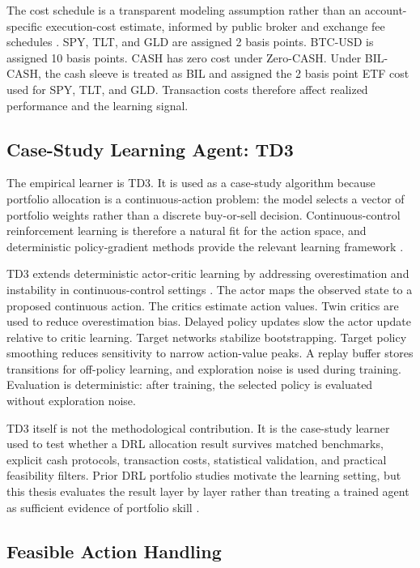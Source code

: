 \documentclass[12pt]{article}
\begin{document}
The cost schedule is a transparent modeling assumption rather than an account-specific execution-cost estimate, informed by public broker and exchange fee schedules \citep{interactivebrokers2026commissions,binance2026tradingfees}. SPY, TLT, and GLD are assigned 2 basis points. BTC-USD is assigned 10 basis points. CASH has zero cost under Zero-CASH. Under BIL-CASH, the cash sleeve is treated as BIL and assigned the 2 basis point ETF cost used for SPY, TLT, and GLD. Transaction costs therefore affect realized performance and the learning signal.

\subsection{Case-Study Learning Agent: TD3}

The empirical learner is TD3. It is used as a case-study algorithm because portfolio allocation is a continuous-action problem: the model selects a vector of portfolio weights rather than a discrete buy-or-sell decision. Continuous-control reinforcement learning is therefore a natural fit for the action space, and deterministic policy-gradient methods provide the relevant learning framework \citep{silver2014,lillicrap2015}.

TD3 extends deterministic actor-critic learning by addressing overestimation and instability in continuous-control settings \citep{fujimoto2018}. The actor maps the observed state to a proposed continuous action. The critics estimate action values. Twin critics are used to reduce overestimation bias. Delayed policy updates slow the actor update relative to critic learning. Target networks stabilize bootstrapping. Target policy smoothing reduces sensitivity to narrow action-value peaks. A replay buffer stores transitions for off-policy learning, and exploration noise is used during training. Evaluation is deterministic: after training, the selected policy is evaluated without exploration noise.

TD3 itself is not the methodological contribution. It is the case-study learner used to test whether a DRL allocation result survives matched benchmarks, explicit cash protocols, transaction costs, statistical validation, and practical feasibility filters. Prior DRL portfolio studies motivate the learning setting, but this thesis evaluates the result layer by layer rather than treating a trained agent as sufficient evidence of portfolio skill \citep{moody2001,almahdi2017,jiang2017,liu2020finrl}.

\subsection{Feasible Action Handling}
\end{document}
